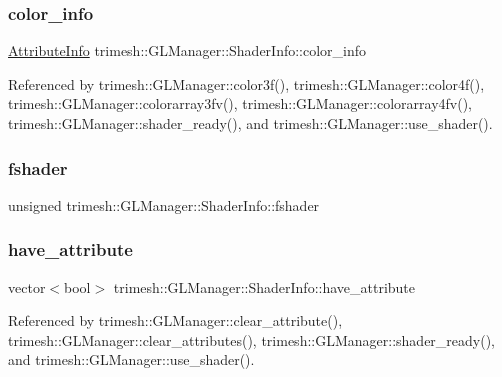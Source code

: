 \subsubsection{\texorpdfstring{color\+\_\+info}{color\_info}}
{\footnotesize\ttfamily \hyperlink{structtrimesh_1_1GLManager_1_1AttributeInfo}{Attribute\+Info} trimesh\+::\+G\+L\+Manager\+::\+Shader\+Info\+::color\+\_\+info}



Referenced by trimesh\+::\+G\+L\+Manager\+::color3f(), trimesh\+::\+G\+L\+Manager\+::color4f(), trimesh\+::\+G\+L\+Manager\+::colorarray3fv(), trimesh\+::\+G\+L\+Manager\+::colorarray4fv(), trimesh\+::\+G\+L\+Manager\+::shader\+\_\+ready(), and trimesh\+::\+G\+L\+Manager\+::use\+\_\+shader().

\mbox{\label{classtrimesh_1_1GLManager_1_1ShaderInfo_aa443c1b6134c6d4e5aaa1f018cf7e082}} 
\subsubsection{\texorpdfstring{fshader}{fshader}}
{\footnotesize\ttfamily unsigned trimesh\+::\+G\+L\+Manager\+::\+Shader\+Info\+::fshader}

\mbox{\label{classtrimesh_1_1GLManager_1_1ShaderInfo_af7b281e45ac7d97b590bc20ca698257e}} 
\subsubsection{\texorpdfstring{have\+\_\+attribute}{have\_attribute}}
{\footnotesize\ttfamily vector$<$bool$>$ trimesh\+::\+G\+L\+Manager\+::\+Shader\+Info\+::have\+\_\+attribute}



Referenced by trimesh\+::\+G\+L\+Manager\+::clear\+\_\+attribute(), trimesh\+::\+G\+L\+Manager\+::clear\+\_\+attributes(), trimesh\+::\+G\+L\+Manager\+::shader\+\_\+ready(), and trimesh\+::\+G\+L\+Manager\+::use\+\_\+shader().

